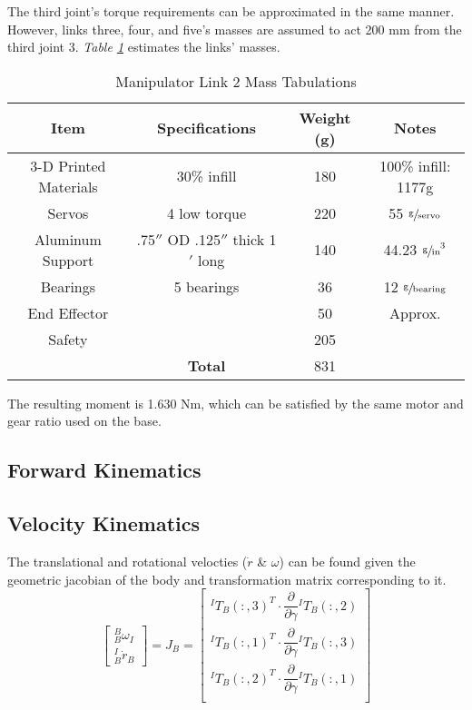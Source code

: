 The third joint’s torque requirements can be approximated in the same manner. However, links three, four, and five’s masses are assumed to act 200 mm from the third joint 3. \emph{Table \ref{tab:arm2}} estimates the links’ masses.

\begin{table}[htp]
  \center
  \caption{Manipulator Link 2 Mass Tabulations}
  \label{tab:arm2}
\begin{tabular}{cc|cc}
\textbf{Item} & \textbf{Specifications} & \textbf{Weight (g)} & \textbf{Notes} \\\hline
3-D Printed Materials & 30\% infill & 180 & 100\% infill: 1177g \\
Servos & 4 low torque & 220 & 55 $\sfrac{\text{g}}{\text{servo}}$ \\
Aluminum Support & .75$''$ OD .125$''$ thick 1$'$ long & 140 & 44.23 $\sfrac{\text{g}}{\text{in}}^3$ \\
Bearings & 5 bearings & 36 & 12 $\sfrac{\text{g}}{\text{bearing}}$ \\
End Effector & & 50 & Approx. \\
Safety & & 205 & \\
& \textbf{Total} & 831 & \\
\end{tabular}
\end{table}

The resulting moment is 1.630 Nm, which can be satisfied by the same motor and gear ratio used on the base.
\subsection{Forward Kinematics}

\subsection{Velocity Kinematics}
The translational and rotational velocties ($\dot{r}$ \& $\omega$) can be found given the geometric jacobian of the body and transformation matrix corresponding to it.
\[
\begin{bmatrix}
  ^B_B\omega_I\\
  ^I_B\dot{r}_B
\end{bmatrix}
= J_B =
\begin{bmatrix}
  ^IT_B(:,3)^T \cdot \dfrac{\partial}{\partial\gamma}{}^IT_B(:,2) \\
  ^IT_B(:,1)^T \cdot \dfrac{\partial}{\partial\gamma}{}^IT_B(:,3) \\
  ^IT_B(:,2)^T \cdot \dfrac{\partial}{\partial\gamma}{}^IT_B(:,1) \\
\end{bmatrix}
\]

